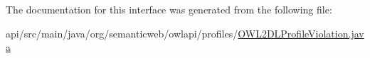 


The documentation for this interface was generated from the following file\-:\begin{DoxyCompactItemize}
\item 
api/src/main/java/org/semanticweb/owlapi/profiles/\hyperlink{_o_w_l2_d_l_profile_violation_8java}{O\-W\-L2\-D\-L\-Profile\-Violation.\-java}\end{DoxyCompactItemize}
